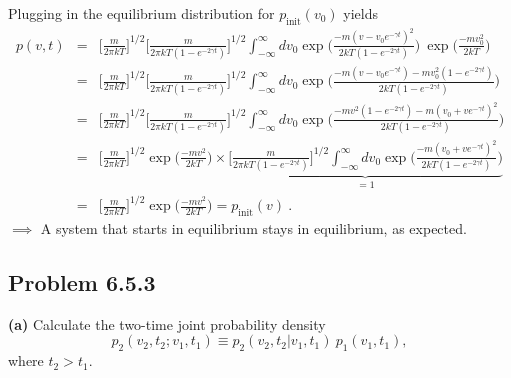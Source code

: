 Plugging in the equilibrium distribution for $p_\text{init}(v_0)$ yields
\begin{eqnarray}
p(v, t) &=& \bigg[\frac{m}{2\pi k T}\bigg]^{1/2} \bigg[\frac{m}{2\pi k T (1-e^{-2\gamma t})}\bigg]^{1/2}  \int_{-\infty}^{\infty} d v_0 \exp\bigg(\frac{-m(v-v_0 e^{-\gamma t})^2}{2 k T (1-e^{-2\gamma t})}\bigg)~\exp\bigg(\frac{-mv_0^2}{2 k T} \bigg) \nonumber \\
&=& \bigg[\frac{m}{2\pi k T}\bigg]^{1/2} \bigg[\frac{m}{2\pi k T (1-e^{-2\gamma t})}\bigg]^{1/2} \int_{-\infty}^{\infty} d v_0 \exp\bigg(\frac{-m(v-v_0 e^{-\gamma t})-m v_0^2 (1-e^{-2\gamma t})}{2 k T (1-e^{-2\gamma t})}\bigg) \nonumber \\
&=& \bigg[\frac{m}{2\pi k T}\bigg]^{1/2} \bigg[\frac{m}{2\pi k T (1-e^{-2\gamma t})}\bigg]^{1/2} \int_{-\infty}^{\infty} d v_0 \exp\bigg(\frac{-mv^2 (1-e^{-2\gamma t})-m (v_0+ve^{-\gamma t})^2}{2 k T (1-e^{-2\gamma t})}\bigg) \nonumber \\
&=& \bigg[\frac{m}{2\pi k T}\bigg]^{1/2} \exp\bigg(\frac{-mv^2}{2 k T}\bigg) \times  \underbrace{\bigg[\frac{m}{2\pi k T (1-e^{-2\gamma t})}\bigg]^{1/2} \int_{-\infty}^{\infty} d v_0 \exp\bigg(\frac{-m (v_0+ve^{-\gamma t})^2}{2 k T (1-e^{-2\gamma t})}\bigg)}_{=1} \nonumber \\
&=& \boxed{\bigg[\frac{m}{2\pi k T}\bigg]^{1/2} \exp\bigg(\frac{-mv^2}{2 k T}\bigg)  = p_\text{init}(v)}~.
\end{eqnarray}
$\implies$ A system that starts in equilibrium stays in equilibrium, as expected.

\subsection{Problem 6.5.3}
\textbf{(a)} Calculate the two-time joint probability density
\begin{equation}
p_2(v_2,t_2;v_1,t_1) \equiv p_2(v_2, t_2 | v_1, t_1)~p_1(v_1, t_1),
\end{equation}
where $t_2>t_1$.


